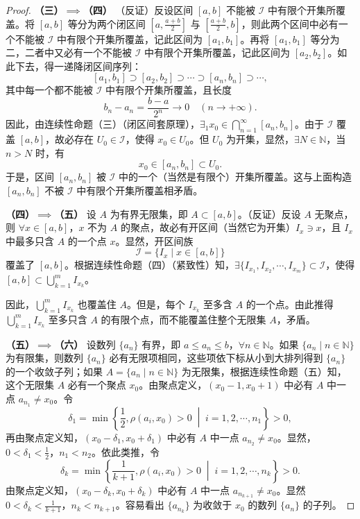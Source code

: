 \begin{proof}
\textbf{（三）$\implies$（四）} （反证）反设区间 $[a,b]$ 不能被 $\mathcal{I}$ 中有限个开集所覆盖。将 $[a,b]$ 等分为两个闭区间 $\left[a, \frac{a+b}{2}\right]$ 与 $\left[\frac{a+b}{2}, b\right]$，则此两个区间中必有一个不能被 $\mathcal{I}$ 中有限个开集所覆盖，记此区间为 $[a_1, b_1]$。再将 $[a_1, b_1]$ 等分为二，二者中又必有一个不能被 $\mathcal{I}$ 中有限个开集所覆盖，记此区间为 $[a_2, b_2]$。如此下去，得一递降闭区间序列：
\[
[a_1, b_1] \supset [a_2, b_2] \supset \cdots \supset [a_n, b_n] \supset \cdots,
\]
其中每一个都不能被 $\mathcal{I}$ 中有限个开集所覆盖，且长度
\[
b_n - a_n = \frac{b-a}{2^n} \to 0\quad (n \to +\infty).
\]
因此，由连续性命题（三）（闭区间套原理），$\exists_1 x_0 \in \bigcap\limits_{n=1}^\infty [a_n, b_n]$。由于 $\mathcal{I}$ 覆盖 $[a,b]$，故必存在 $U_0 \in \mathcal{I}$，使得 $x_0 \in U_0$。但 $U_0$ 为开集，显然，$\exists N \in \mathbb{N}$，当 $n > N$ 时，有
\[
x_0 \in [a_n, b_n] \subset U_0.
\]
于是，区间 $[a_n, b_n]$ 被 $\mathcal{I}$ 中的一个（当然是有限个）开集所覆盖。这与上面构造 $[a_n, b_n]$ 不被 $\mathcal{I}$ 中有限个开集所覆盖相矛盾。

\textbf{（四）$\implies$（五）} 设 $A$ 为有界无限集，即 $A \subset [a,b]$。（反证）反设 $A$ 无聚点，则 $\forall x \in [a,b]$，$x$ 不为 $A$ 的聚点，故必有开区间（当然它为开集）$I_x \ni x$，且 $I_x$ 中最多只含 $A$ 的一个点 $x$。显然，开区间族
\[
\mathcal{I} = \{I_x \mid x \in [a,b]\}
\]
覆盖了 $[a,b]$。根据连续性命题（四）（紧致性）知，$\exists \{I_{x_1}, I_{x_2}, \cdots, I_{x_m}\} \subset \mathcal{I}$，使得 $[a,b] \subset \bigcup\limits_{k=1}^m I_{x_k}$。

因此，$\bigcup\limits_{k=1}^m I_{x_k}$ 也覆盖住 $A$。但是，每个 $I_{x_k}$ 至多含 $A$ 的一个点。由此推得 $\bigcup\limits_{k=1}^m I_{x_k}$ 至多只含 $A$ 的有限个点，而不能覆盖住整个无限集 $A$，矛盾。

\textbf{（五）$\implies$（六）} 设数列 $\{a_n\}$ 有界，即 $a \leqslant a_n \leqslant b$，$\forall n \in \mathbb{N}$。如果 $\{a_n \mid n \in \mathbb{N}\}$ 为有限集，则数列 $\{a_n\}$ 必有无限项相同，这些项依下标从小到大排列得到 $\{a_n\}$ 的一个收敛子列；如果 $A = \{a_n \mid n \in \mathbb{N}\}$ 为无限集，根据连续性命题（五）知，这个无限集 $A$ 必有一个聚点 $x_0$。由聚点定义，$(x_0 - 1, x_0 + 1)$ 中必有 $A$ 中一点 $a_{n_1} \neq x_0$。令
\[
\delta_1 = \min\left\{\frac{1}{2}, \rho(a_i, x_0) > 0 \;\middle|\; i = 1, 2, \cdots, n_1\right\} > 0,
\]
再由聚点定义知，$(x_0 - \delta_1, x_0 + \delta_1)$ 中必有 $A$ 中一点 $a_{n_2} \neq x_0$。显然，$0 < \delta_1 < \frac{1}{2}$，$n_1 < n_2$。依此类推，令
\[
\delta_k = \min\left\{\frac{1}{k+1}, \rho(a_i, x_0) > 0 \;\middle|\; i = 1, 2, \cdots, n_k\right\} > 0.
\]
由聚点定义知，$(x_0 - \delta_k, x_0 + \delta_k)$ 中必有 $A$ 中一点 $a_{n_{k+1}} \neq x_0$。显然 $0 < \delta_k < \frac{1}{k+1}$，$n_k < n_{k+1}$。容易看出 $\{a_{n_k}\}$ 为收敛于 $x_0$ 的数列 $\{a_n\}$ 的子列。


\end{proof}

